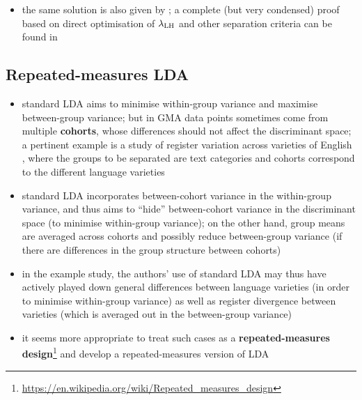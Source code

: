 \documentclass[a4paper]{article}
\begin{document}
\begin{itemize}
   \footnote{The coordinate transformation $\mathbf{S}$ ensures that average within-group variance is a unit sphere ($\mathbf{W}' = \mathbf{I}$). Since $\mathbf{A}'$ is chosen to be an orthogonal projection, it preserves the spherical property but reduces variance to the proportion captured by the discriminant space.}
 \item the same solution is also given by \citet[192]{Bishop:06}; a complete (but very condensed) proof based on direct optimisation of $\lambda_{\text{LH}}$ and other separation criteria can be found in \citep[446--452]{Fukunaga:90}
\end{itemize}

\subsection{Repeated-measures LDA}
\label{sec:lda:repeated}

\begin{itemize}
\item standard LDA aims to minimise within-group variance and maximise between-group variance; but in GMA data points sometimes come from multiple \textbf{cohorts}, whose differences should not affect the discriminant space; a pertinent example is a study of register variation across varieties of English \citep{Neumann:Evert:21}, where the groups to be separated are text categories and cohorts correspond to the different language varieties
\item standard LDA incorporates between-cohort variance in the within-group variance, and thus aims to ``hide'' between-cohort variance in the discriminant space (to minimise within-group variance); on the other hand, group means are averaged across cohorts and possibly reduce between-group variance (if there are differences in the group structure between cohorts)
\item in the example study, the authors' use of standard LDA may thus have actively played down general differences between language varieties (in order to minimise within-group variance) as well as register divergence between varieties (which is averaged out in the between-group variance)
\item it seems more appropriate to treat such cases as a \textbf{repeated-measures design}\footnote{\url{https://en.wikipedia.org/wiki/Repeated_measures_design}} and develop a repeated-measures version of LDA
\end{itemize}
\end{document}
